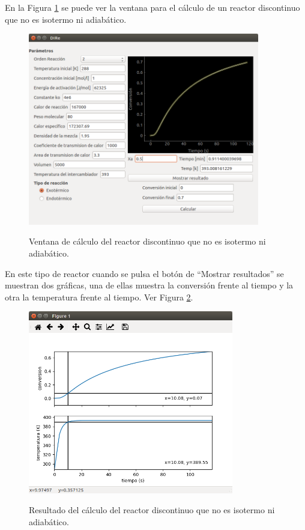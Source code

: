 	En la Figura \ref{dis_no_iso_no_adi} se puede ver la ventana para el cálculo de un reactor discontinuo que no es isotermo ni adiabático.
	\begin{figure}[!h]
		\centering
		\includegraphics[width=0.9\textwidth]{./imagenes/reactor_discontinuo/no_iso_no_adi.png}
		\label{dis_no_iso_no_adi}
		\caption{Ventana de cálculo del reactor discontinuo que no es isotermo ni adiabático.}
	\end{figure}

	
	En este tipo de reactor cuando se pulsa el botón de ``Mostrar resultados'' se muestran dos gráficas, una de ellas muestra la conversión frente al tiempo y la otra la temperatura frente al tiempo. Ver Figura \ref{dis_no_iso_no_adi_fig}.
	
	\begin{figure}[!h]
		\centering
		\includegraphics[width=0.8\textwidth]{./imagenes/reactor_discontinuo/no_iso_no_adi_fig.png}
		\label{dis_no_iso_no_adi_fig}
		\caption{Resultado del cálculo del reactor discontinuo que no es isotermo ni adiabático.}
	\end{figure}